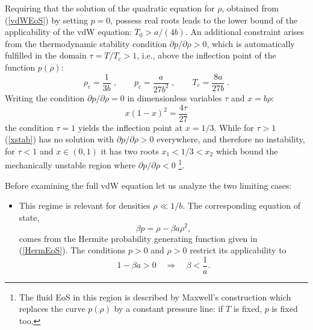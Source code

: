 \documentclass[a4paper,12pt]{amsart}
\theoremstyle{definition}
\theoremstyle{remark}
\begin{document}
\begin{enumerate}[label=(\roman*), leftmargin=*]
Requiring that the solution of the quadratic equation for \(\rho\), obtained from (\ref{vdWEoS}) by setting \(p=0\), possess real roots leads to the lower bound of the applicability of the vdW equation: $T_0>a/(4b)$.
An additional constraint arises from the thermodynamic stability condition 
\(\partial p/\partial\rho > 0\), which is automatically fulfilled in the domain \(\tau = T/T_c > 1\), i.e., above the inflection point of the function \(p(\rho)\):
\[
\rho_c = \frac{1}{3b}\;, \qquad 
p_c = \frac{a}{27 b^2}\;, \qquad
T_c = \frac{8a}{27 b}\;.
\]
Writing the condition $\partial p/\partial \rho=0$  in dimensionless variables $\tau$ and $x=b\rho$:
\begin{equation}\label{xstab}
x(1-x)^2=\frac{4\tau}{27}    
\end{equation}
the condition $\tau=1$ yields the inflection point at $x=1/3$. 
While for $\tau>1$ (\ref{xstab}) has no solution with $\partial p/\partial\rho>0$ everywhere, and therefore no instability,
for $\tau<1$ and $x\in (0, 1)$ it has two roots $x_1<1/3<x_2$ which bound the mechanically unstable region where  $\partial p/\partial\rho<0$ \footnote{ 
 The fluid EoS in this region is described by Maxwell’s construction which replaces the curve $p(\rho)$ by a constant pressure line:  if $T$ is fixed, $p$ is fixed too.}. 
 

Before examining the full vdW equation let us analyze the two limiting cases:
\begin{itemize}
    \item[\(b=0:\)] This regime is relevant for densities \(\rho \ll 1/b\). The corresponding equation of state,
    \[
    \beta p = \rho - \beta a \rho^2,
    \]
    comes from the Hermite probability generating function given in (\ref{HermEoS}). The conditions \(p>0\) and \(\rho>0\) restrict its applicability to
    \[
    1 - \beta a > 0 \quad \Rightarrow \quad \beta < \frac{1}{a}.
    \]


\end{itemize}
\end{enumerate}
\end{document}
